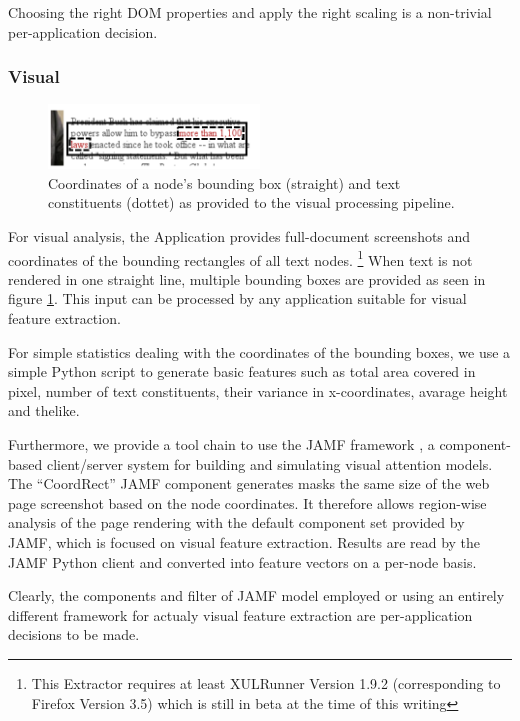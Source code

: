 Choosing the right DOM properties and apply the right scaling is a non-trivial per-application decision.

\subsubsection{Visual}

\begin{figure}
\includegraphics[width=0.5\textwidth]{vizwrap}
\caption{\label{f:vizwrap}Coordinates of a node's bounding box (straight) and text constituents (dottet) as provided to the visual processing pipeline.}
\end{figure}

For visual analysis, the Application provides full-document screenshots and coordinates of the bounding rectangles of all text nodes.%
\footnote{This Extractor requires at least XULRunner Version 1.9.2 (corresponding to Firefox Version 3.5) which is still in beta at the time of this writing}
When text is not rendered in one straight line, multiple bounding boxes are provided as seen in figure \ref{f:vizwrap}.
This input can be processed by any application suitable for visual feature extraction.

For simple statistics dealing with the coordinates of the bounding boxes, we use a simple Python script to generate basic features such as total area covered in pixel, number of text constituents, their variance in x-coordinates, avarage height and thelike.

Furthermore, we provide a tool chain to use the JAMF framework \cite{Steger08}, a component-based client/server system for building and simulating visual attention models.
The ``CoordRect'' JAMF component generates masks the same size of the web page screenshot based on the node coordinates.
It therefore allows region-wise analysis of the page rendering with the default component set provided by JAMF, which is focused on visual feature extraction.
Results are read by the JAMF Python client and converted into feature vectors on a per-node basis.

Clearly, the components and filter of JAMF model employed or using an entirely different framework for actualy visual feature extraction are per-application decisions to be made.


